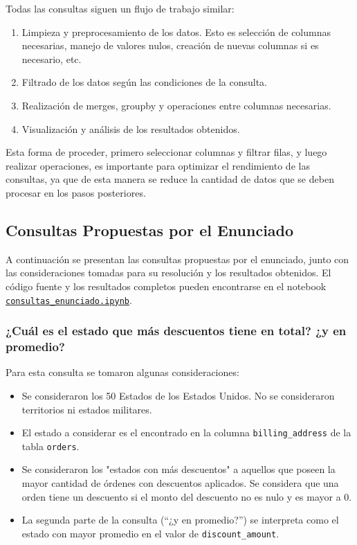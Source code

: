Todas las consultas siguen un flujo de trabajo similar:
\begin{enumerate}
    \item Limpieza y preprocesamiento de los datos. Esto es selección de columnas necesarias, manejo de valores nulos, creación de nuevas columnas si es necesario, etc.
    \item Filtrado de los datos según las condiciones de la consulta.
    \item Realización de merges, groupby y operaciones entre columnas necesarias.
    \item Visualización y análisis de los resultados obtenidos.
\end{enumerate}
Esta forma de proceder, primero seleccionar columnas y filtrar filas, y luego realizar operaciones, es importante para optimizar el rendimiento de las consultas, ya que de esta manera se reduce la cantidad de datos que se deben procesar en los pasos posteriores.

\subsection{Consultas Propuestas por el Enunciado}

A continuación se presentan las consultas propuestas por el enunciado, junto con las consideraciones tomadas para su resolución y los resultados obtenidos. El código fuente y los resultados completos pueden encontrarse en el notebook \href{https://github.com/patricioibar/datos-tp1/blob/main/consultas_enunciado.ipynb}{\texttt{consultas\_enunciado.ipynb}}.

\subsubsection{¿Cuál es el estado que más descuentos tiene en total? ¿y en promedio?}

Para esta consulta se tomaron algunas consideraciones:
\begin{itemize}
    \item Se consideraron los 50 Estados de los Estados Unidos. No se consideraron territorios ni estados militares.
    \item El estado a considerar es el encontrado en la columna \texttt{billing\_address} de la tabla \texttt{orders}.
    \item Se consideraron los "estados con más descuentos" a aquellos que poseen la mayor cantidad de órdenes con descuentos aplicados. Se considera que una orden tiene un descuento si el monto del descuento no es nulo y es mayor a 0.
    \item La segunda parte de la consulta (``¿y en promedio?'') se interpreta como el estado con mayor promedio en el valor de \texttt{discount\_amount}.
\end{itemize}

